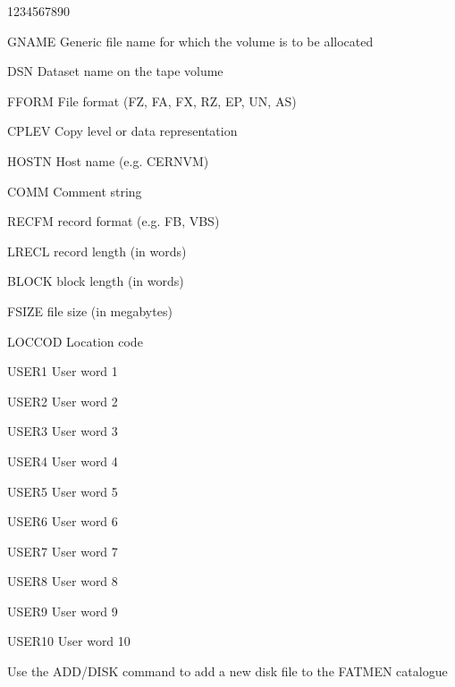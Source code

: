 \begin{DLtt}{1234567890}
\item[GNAME]Generic file name for which the volume is to be allocated
\item[DSN]Dataset name on the tape volume
\item[FFORM]File format (FZ, FA, FX, RZ, EP, UN, AS)
\item[CPLEV]Copy level or data representation
\item[HOSTN]Host name (e.g. CERNVM)
\item[COMM]Comment string 
\item[RECFM]record format (e.g. FB, VBS)
\item[LRECL]record length (in words)
\item[BLOCK]block length (in words)
\item[FSIZE]file size (in megabytes)
\item[LOCCOD]Location code
\item[USER1]User word 1
\item[USER2]User word 2
\item[USER3]User word 3
\item[USER4]User word 4
\item[USER5]User word 5
\item[USER6]User word 6
\item[USER7]User word 7
\item[USER8]User word 8
\item[USER9]User word 9
\item[USER10]User word 10
\end{DLtt}
Use the ADD/DISK command to add a new disk file to the FATMEN catalogue
